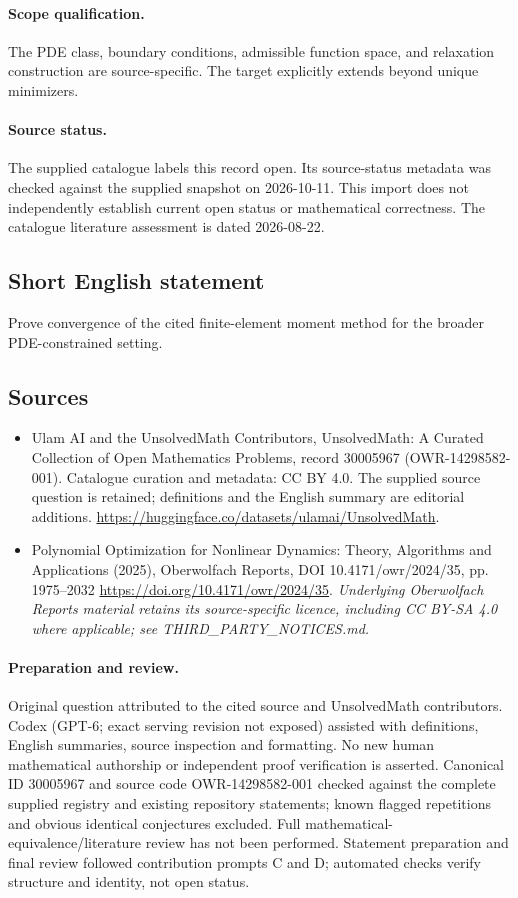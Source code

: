 \documentclass[11pt]{article}
\begin{document}
\paragraph{Scope qualification.}
The PDE class, boundary conditions, admissible function space, and relaxation construction are source-specific. The target explicitly extends beyond unique minimizers.
\paragraph{Source status.}
The supplied catalogue labels this record open. Its source-status metadata was checked against the supplied snapshot on 2026-10-11. This import does not independently establish current open status or mathematical correctness. The catalogue literature assessment is dated 2026-08-22.
\subsection{Short English statement}
Prove convergence of the cited finite-element moment method for the broader PDE-constrained setting.
\subsection{Sources}
\begin{itemize}
\item[S1] Ulam AI and the UnsolvedMath Contributors, UnsolvedMath: A Curated Collection of Open Mathematics Problems, record 30005967 (OWR-14298582-001). Catalogue curation and metadata: CC BY 4.0. The supplied source question is retained; definitions and the English summary are editorial additions.
\url{https://huggingface.co/datasets/ulamai/UnsolvedMath}.
\item[S2] Polynomial Optimization for Nonlinear Dynamics: Theory, Algorithms and Applications (2025), Oberwolfach Reports, DOI 10.4171/owr/2024/35, pp. 1975--2032
\url{https://doi.org/10.4171/owr/2024/35}.
\textit{Underlying Oberwolfach Reports material retains its source-specific licence, including CC BY-SA 4.0 where applicable; see THIRD\_PARTY\_NOTICES.md.}
\end{itemize}
\paragraph{Preparation and review.}
Original question attributed to the cited source and UnsolvedMath contributors. Codex (GPT-6; exact serving revision not exposed) assisted with definitions, English summaries, source inspection and formatting. No new human mathematical authorship or independent proof verification is asserted. Canonical ID 30005967 and source code OWR-14298582-001 checked against the complete supplied registry and existing repository statements; known flagged repetitions and obvious identical conjectures excluded. Full mathematical-equivalence/literature review has not been performed. Statement preparation and final review followed contribution prompts C and D; automated checks verify structure and identity, not open status.
\label{end:30005967}
\end{document}
